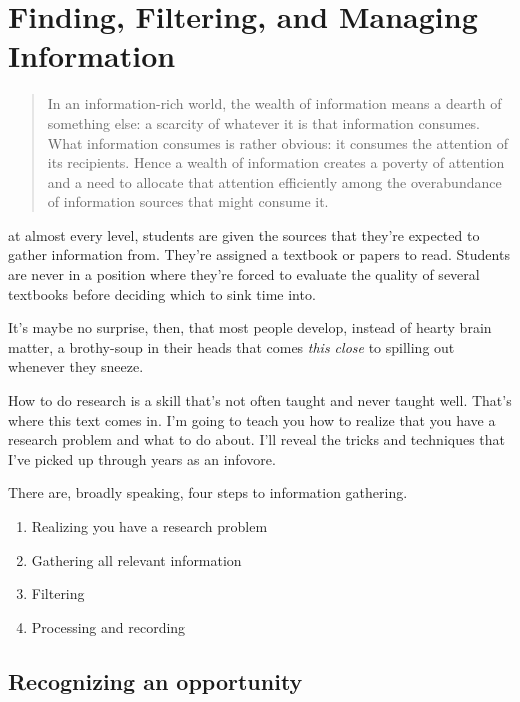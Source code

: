 \chapter{Finding, Filtering, and Managing Information}
\begin{quote}
  In an information-rich world, the wealth of information means a dearth of something else: a scarcity of whatever it is that information consumes. What information consumes is rather obvious: it consumes the attention of its recipients. Hence a wealth of information creates a poverty of attention and a need to allocate that attention efficiently among the overabundance of information sources that might consume it.
\end{quote}


 at almost every level, students are given the sources that they're expected to gather information from. They're assigned a textbook or papers to read. Students are never in a position where they're forced to evaluate the quality of several textbooks before deciding which to sink time into.

It's maybe no surprise, then, that most people develop, instead of hearty brain matter, a brothy-soup in their heads that comes \textit{this close} to spilling out whenever they sneeze.

How to do research is a skill that's not often taught and never taught
well. That's where this text comes in. I'm going to teach you how to realize
that you have a research problem and what to do about. I'll reveal the tricks
and techniques that I've picked up through years as an infovore.

There are, broadly speaking, four steps to information gathering.

\begin{enumerate}
  \item Realizing you have a research problem
  \item Gathering all relevant information
  \item Filtering 
  \item Processing and recording
\end{enumerate}

\section{Recognizing an opportunity}

